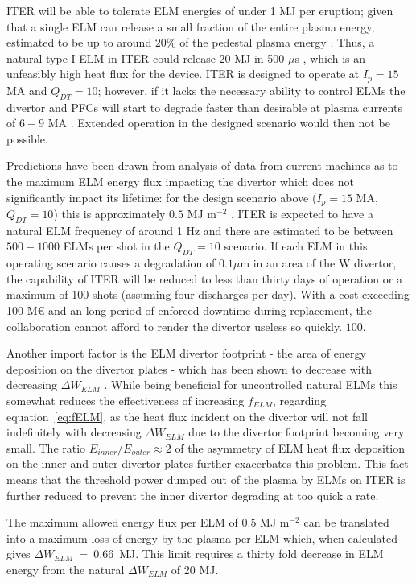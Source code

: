\documentclass[11pt, twocolumn]{article}  %
\begin{document}
ITER will be able to tolerate ELM energies of under 1 MJ per eruption; given that a single ELM can release a small fraction of the entire plasma energy, estimated to be up to around $20\%$ of the pedestal plasma energy \cite{Loarte2003}. Thus, a natural type I ELM in ITER could release 20 MJ in 500 $\mu$s \cite{KirkFF}, which is an unfeasibly high heat flux for the device. ITER is designed to operate at $I_p = 15$ MA and $Q_{DT} = 10$; however, if it lacks the necessary ability to control ELMs the divertor and PFCs will start to degrade faster than desirable at plasma currents of $6-9$ MA \cite{Lang2013}. Extended operation in the designed scenario would then not be possible.

Predictions have been drawn from analysis of data from current machines as to the maximum ELM energy flux impacting the divertor which does not significantly impact its lifetime: for the design scenario above ($I_p = 15$ MA, $Q_{DT} = 10$) this is approximately $0.5$ MJ m$^{-2}$ \cite{LoarteTR2013}. ITER is expected to have a natural ELM frequency of around 1 Hz \cite{KirkFF} and there are estimated to be between $500-1000$ ELMs per shot in the $Q_{DT}=10$ scenario. If each ELM in this operating scenario causes a degradation of $0.1 \mu$m in an area of the W divertor, the capability of ITER will be reduced to less than thirty days of operation or a maximum of 100 shots \cite{Lang2013} (assuming four discharges per day). With a cost exceeding 100 M€ \cite{Tsitrone2013} and an long period of enforced downtime during replacement, the collaboration cannot afford to render the divertor useless so quickly. $100$.

Another import factor is the ELM divertor footprint - the area of energy deposition on the divertor plates - which has been shown to decrease with decreasing $\Delta W_{ELM}$ \cite{Eich2011}. While being beneficial for uncontrolled natural ELMs this somewhat reduces the effectiveness of increasing $f_{ELM}$, regarding equation~\ref{eq:fELM}, as the heat flux incident on the divertor will not fall indefinitely with decreasing $\Delta W_{ELM}$ due to the divertor footprint becoming very small. The ratio $E_{inner}/E_{outer} \approx 2$ \cite{Eich2007} of the asymmetry of ELM heat flux deposition on the inner and outer divertor plates further exacerbates this problem. This fact means that the threshold power dumped out of the plasma by ELMs on ITER is further reduced to prevent the inner divertor degrading at too quick a rate.

The maximum allowed energy flux per ELM of $0.5$ MJ m$^{-2}$ can be translated into a maximum loss of energy by the plasma per ELM which, when calculated gives $\Delta W_{ELM}~=~0.66$~MJ\cite{Loarte2010conf}. This limit requires a thirty fold decrease in ELM energy from the natural $\Delta W_{ELM}$ of 20 MJ. 
\end{document}

